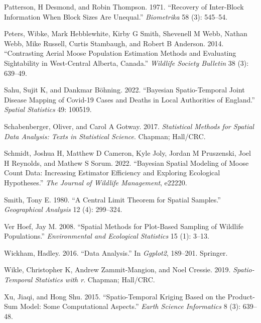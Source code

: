 \documentclass[smallextended]{svjour3}       %
\newlength{\cslhangindent}
\newlength{\cslentryspacingunit} %
\newenvironment{CSLReferences}[2] %
 {%
  \setlength{\parindent}{0pt}
  \ifodd #1
  \let\oldpar\par
  \def\par{\hangindent=\cslhangindent\oldpar}
  \fi
  \setlength{\parskip}{#2\cslentryspacingunit}
 }%
 {}
\begin{document}
\begin{CSLReferences}{1}{0}
\leavevmode{}%
Patterson, H Desmond, and Robin Thompson. 1971. {``Recovery of
Inter-Block Information When Block Sizes Are Unequal.''}
\emph{Biometrika} 58 (3): 545--54.

\leavevmode{}%
Peters, Wibke, Mark Hebblewhite, Kirby G Smith, Shevenell M Webb, Nathan
Webb, Mike Russell, Curtis Stambaugh, and Robert B Anderson. 2014.
{``Contrasting Aerial Moose Population Estimation Methods and Evaluating
Sightability in West-Central Alberta, Canada.''} \emph{Wildlife Society
Bulletin} 38 (3): 639--49.

\leavevmode{}%
Sahu, Sujit K, and Dankmar Böhning. 2022. {``Bayesian Spatio-Temporal
Joint Disease Mapping of Covid-19 Cases and Deaths in Local Authorities
of England.''} \emph{Spatial Statistics} 49: 100519.

\leavevmode{}%
Schabenberger, Oliver, and Carol A Gotway. 2017. \emph{Statistical
Methods for Spatial Data Analysis: Texts in Statistical Science}.
Chapman; Hall/CRC.

\leavevmode{}%
Schmidt, Joshua H, Matthew D Cameron, Kyle Joly, Jordan M Pruszenski,
Joel H Reynolds, and Mathew S Sorum. 2022. {``Bayesian Spatial Modeling
of Moose Count Data: Increasing Estimator Efficiency and Exploring
Ecological Hypotheses.''} \emph{The Journal of Wildlife Management},
e22220.

\leavevmode{}%
Smith, Tony E. 1980. {``A Central Limit Theorem for Spatial Samples.''}
\emph{Geographical Analysis} 12 (4): 299--324.

\leavevmode{}%
Ver Hoef, Jay M. 2008. {``Spatial Methods for Plot-Based Sampling of
Wildlife Populations.''} \emph{Environmental and Ecological Statistics}
15 (1): 3--13.

\leavevmode{}%
Wickham, Hadley. 2016. {``Data Analysis.''} In \emph{Ggplot2}, 189--201.
Springer.

\leavevmode{}%
Wikle, Christopher K, Andrew Zammit-Mangion, and Noel Cressie. 2019.
\emph{Spatio-Temporal Statistics with r}. Chapman; Hall/CRC.

\leavevmode{}%
Xu, Jiaqi, and Hong Shu. 2015. {``Spatio-Temporal Kriging Based on the
Product-Sum Model: Some Computational Aspects.''} \emph{Earth Science
Informatics} 8 (3): 639--48.

\end{CSLReferences}




\end{document}
